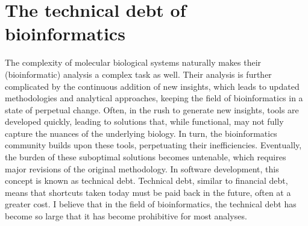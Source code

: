 \section{The technical debt of bioinformatics}

The complexity of molecular biological systems naturally makes their (bioinformatic) analysis a complex task as well. Their analysis is further complicated by the continuous addition of new insights, which leads to updated methodologies and analytical approaches, keeping the field of bioinformatics in a state of perpetual change. Often, in the rush to generate new insights, tools are developed quickly, leading to solutions that, while functional, may not fully capture the nuances of the underlying biology. In turn, the bioinformatics community builds upon these tools, perpetuating their inefficiencies. Eventually, the burden of these suboptimal solutions becomes untenable, which requires major revisions of the original methodology. In software development, this concept is known as technical debt. Technical debt, similar to financial debt, means that shortcuts taken today must be paid back in the future, often at a greater cost. I believe that in the field of bioinformatics, the technical debt has become so large that it has become prohibitive for most analyses.

